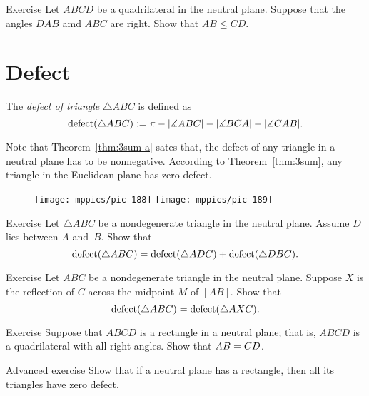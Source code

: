\begin{thm}{Exercise}\label{ex:neutral-quadrilateral}
Let $ABCD$ be a quadrilateral in the neutral plane.
Suppose that the angles $DAB$ amd $ABC$ are right.
Show that $AB\le CD$.
\end{thm}

\section*{Defect}

The \emph{defect of triangle} $\triangle ABC$ is defined as 
$$\mathop{\rm defect}\nolimits(\triangle ABC)
:= 
\pi-|\measuredangle ABC|-|\measuredangle BCA|-|\measuredangle CAB|.$$

Note that Theorem~\ref{thm:3sum-a} sates that, the defect of any triangle in a neutral plane has to be nonnegative.
According to Theorem~\ref{thm:3sum}, any triangle in
the Euclidean plane has zero defect.

{

\begin{wrapfigure}{o}{24mm}
\vskip-6mm
\centering
\texttt{[image: mppics/pic-188]}
\vskip4mm
\texttt{[image: mppics/pic-189]}
\end{wrapfigure}

\begin{thm}{Exercise}\label{ex:defect}
Let $\triangle ABC$ be a nondegenerate triangle in the neutral plane.
Assume $D$ lies between $A$ and~$B$.
Show that 
$$\mathop{\rm defect}\nolimits(\triangle ABC)=\mathop{\rm defect}\nolimits(\triangle ADC)+\mathop{\rm defect}\nolimits(\triangle DBC).$$

\end{thm}


\begin{thm}{Exercise}\label{ex:defect=} Let $ABC$ be a nondegenerate triangle in the neutral plane.
Suppose $X$ is the reflection of $C$ across the midpoint $M$ of $[AB]$.
Show that 
$$\mathop{\rm defect}\nolimits(\triangle ABC)=\mathop{\rm defect}\nolimits(\triangle AXC).$$
\end{thm}

}

\vskip-2mm

\begin{thm}{Exercise}\label{ex:neutral-rectangle}
Suppose that $ABCD$ is a rectangle in a neutral plane;
that is, $ABCD$ is a quadrilateral with all right angles.
Show that $AB\z=CD$. 
\end{thm}

\begin{thm}{Advanced exercise}
Show that if a neutral plane has a rectangle, then all its triangles have zero defect.
\end{thm}


